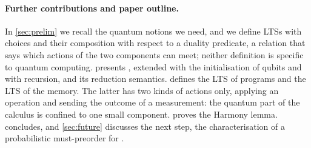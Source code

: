 \paragraph{Further contributions and paper outline.} In \cref{sec:prelim} we
recall the quantum notions we need, and we define LTSs with choices and
their composition with respect to a duality predicate, a relation that says
which actions of the two components can meet; neither definition is
specific to quantum computing.  presents \lqCCS, extended with
the initialisation of qubits and with recursion, and its reduction semantics. 
defines the LTS of programs and the LTS of the memory. The latter has two
kinds of actions only, applying an operation and sending the outcome of a
measurement: the quantum part of the calculus is confined to one small
component.
 proves the Harmony lemma.  concludes,
and \cref{sec:future} discusses the next step, the characterisation of a
probabilistic must-preorder for \lqCCS.
